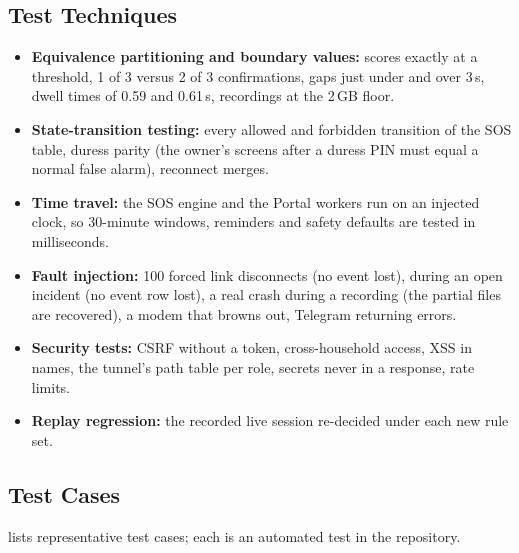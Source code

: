 \subsection{Test Techniques}
\begin{itemize}
\item \textbf{Equivalence partitioning and boundary values:} scores exactly at a threshold, 1 of 3 versus 2 of 3 confirmations, gaps just under and over 3\,s, dwell times of 0.59 and 0.61\,s, recordings at the 2\,GB floor.
\item \textbf{State-transition testing:} every allowed and forbidden transition of the SOS table, duress parity (the owner's screens after a duress PIN must equal a normal false alarm), reconnect merges.
\item \textbf{Time travel:} the SOS engine and the Portal workers run on an injected clock, so 30-minute windows, reminders and safety defaults are tested in milliseconds.
\item \textbf{Fault injection:} 100 forced link disconnects (no event lost),  during an open incident (no event row lost), a real  crash during a recording (the partial files are recovered), a modem that browns out, Telegram returning errors.
\item \textbf{Security tests:} CSRF without a token, cross-household access, XSS in names, the tunnel's path table per role, secrets never in a response, rate limits.
\item \textbf{Replay regression:} the recorded live session re-decided under each new rule set.
\end{itemize}

\subsection{Test Cases}
 lists representative test cases; each is an automated test in the repository.

